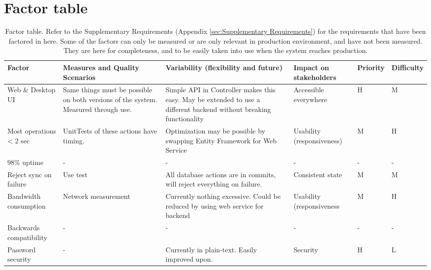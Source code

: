\section{Factor table}
\label{sec:factor-table}

\begin{table}[htb]
    \centering
    \begin{tabular}{ | p{65px} | p{90px} | p{110px} | p{50px} | p{20px} | p{20px} | }
        \hline
        {\bf Factor} & {\bf Measures and Quality Scenarios} & {\bf Variability (flexibility and future)} & {\bf Impact on stakeholders} & {\bf Prio\-rity} & {\bf Diffi\-culty}\\
        \hline
        Web \& Desktop UI &
        Same things must be possible on both versions of the system. Measured through use. &
        Simple API in Controller makes this easy. May be extended to use a different backend without breaking functionality &
        Accessible everywhere &
        H &
        M \\
        \hline
        Most operations < 2 sec &
        UnitTests of these actions have timing. &
        Optimization may be possible by swapping Entity Framework for Web Service &
        Usability (respon\-sive\-ness) &
        M &
        H \\
        \hline
        98\% uptime &
        - &
        - &
        - &
        - &
        - \\
        \hline
        Reject sync on failure &
        Use test &
        All database actions are in commits, will reject everything on failure. &
        Consistent state &
        M &
        M \\
        \hline
        Bandwidth consump\-tion &
        Network measurement &
        Currently nothing excessive. Could be reduced by using web service for backend &
        Usability (respon\-sive\-ness &
        M &
        H \\
        \hline
        Backwards compatibility &
        - &
        - &
        - &
        - &
        - \\
        \hline
        Password security &
        - &
        Currently in plain-text. Easily improved upon. &
        Security &
        H &
        L \\
        \hline
    \end{tabular}
    \caption{Factor table. Refer to the Supplementary Requirements (Appendix \ref{sec:Supplementary Requirements}) for the requirements
        that have been factored in here. Some of the factors can only be measured or are only relevant in production environment, and
        have not been measured. They are here for completeness, and to be easily taken into use when the system reaches production.}
    \label{tab:factor-table}
\end{table}